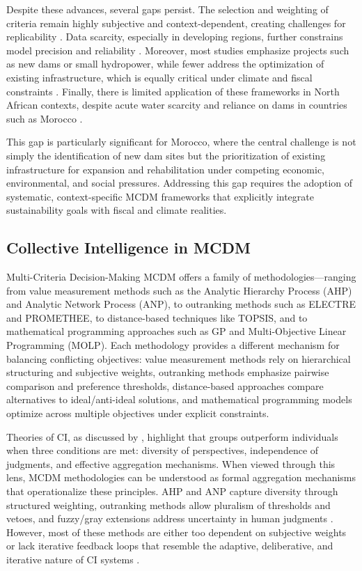 Despite these advances, several gaps persist. The selection and weighting of criteria remain highly subjective and context-dependent, creating challenges for replicability \cite{Belton2002,Mardani2015}. Data scarcity, especially in developing regions, further constrains model precision and reliability \cite{POHEKAR2004, Dirie2024}. Moreover, most studies emphasize projects such as new dams or small hydropower, while fewer address the optimization of existing infrastructure, which is equally critical under climate and fiscal constraints \cite{KUMAR2017596,Romanelli2018}. Finally, there is limited application of these frameworks in North African contexts, despite acute water scarcity and reliance on dams in countries such as Morocco \cite{ettazarini2021}.

This gap is particularly significant for Morocco, where the central challenge is not simply the identification of new dam sites but the prioritization of existing infrastructure for expansion and rehabilitation under competing economic, environmental, and social pressures. Addressing this gap requires the adoption of systematic, context-specific MCDM frameworks that explicitly integrate sustainability goals with fiscal and climate realities.

\subsection{Collective Intelligence in MCDM}
Multi-Criteria Decision-Making MCDM offers a family of methodologies—ranging from value measurement methods such as the Analytic Hierarchy Process (AHP) and Analytic Network Process (ANP), to outranking methods such as \gls{ELECTRE} and \gls{PROMETHEE}, to distance-based techniques like \gls{TOPSIS}, and to mathematical programming approaches such as \gls{GP} and Multi-Objective Linear Programming (MOLP)\cite{Belton2002,Aruldoss2013}. Each methodology provides a different mechanism for balancing conflicting objectives: value measurement methods rely on hierarchical structuring and subjective weights, outranking methods emphasize pairwise comparison and preference thresholds, distance-based approaches compare alternatives to ideal/anti-ideal solutions, and mathematical programming models optimize across multiple objectives under explicit constraints.

Theories of CI, as discussed by \cite{Woolley2010}, highlight that groups outperform individuals when three conditions are met: diversity of perspectives, independence of judgments, and effective aggregation mechanisms. When viewed through this lens, MCDM methodologies can be understood as formal aggregation mechanisms that operationalize these principles. AHP and ANP capture diversity through structured weighting, outranking methods allow pluralism of thresholds and vetoes, and fuzzy/gray extensions address uncertainty in human judgments \cite{Mardani2015,LIANG1999}. However, most of these methods are either too dependent on subjective weights or lack iterative feedback loops that resemble the adaptive, deliberative, and iterative nature of CI systems \cite{Cinalli2015}.

